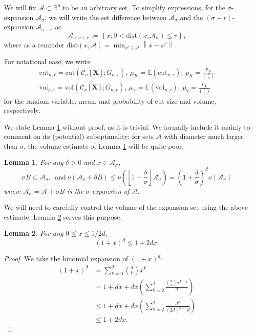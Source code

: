 \documentclass{article}
\newcommand{\set}[1]{\left\{#1\right\}}
\newcommand{\vol}{\mathrm{vol}}
\newcommand{\Reals}{\mathbb{R}}
\newcommand{\Rd}{\Reals^d}
\newcommand{\norm}[1]{\left\lVert#1\right\rVert}
\newcommand{\1}{\mathbf{1}}
\newcommand{\dist}{\mathrm{dist}}
\newcommand{\cut}{\mathrm{cut}}
\newcommand{\Xbf}{\mathbf{X}}
\newcommand{\Cset}{\mathcal{C}}
\newcommand{\Aset}{\mathcal{A}}
\newcommand{\Asig}{\Aset_{\sigma}}
\newcommand{\Csig}{\Cset_{\sigma}}
\newcommand{\Asigr}{\Aset_{\sigma,\sigma + r}}
\theoremstyle{aldenthm}
\newtheorem{lemma}{Lemma}
\begin{document}
We will fix $\Aset \subset \Rd$ to be an arbitrary set. To simplify expressions, for the $\sigma$-expansion $\Asig$, we will write the set difference between $\Asig$ and the $(\sigma + r)$-expansion $\Aset_{\sigma + r}$ as 
\begin{equation*}
\Asigr := \set{x: 0 < \dist(x, \Asig) \leq r},
\end{equation*}
where as a reminder $\dist(x, \Aset) = \min_{x' \in \Aset} \norm{x - x'}$.

For notational ease, we write
\begin{align*}
\cut_{n,r} = \cut(\Csig[\Xbf]; G_{n,r}), ~ \mu_K = \mathbb{E}(\cut_{n,r}), ~ p_K = \frac{\mu_K}{{n \choose 2}} \\
\vol_{n,r} = \vol(\Csig[\Xbf]; G_{n,r}), ~ \mu_V = \mathbb{E}(\vol_{n,r}), ~ p_V = \frac{\mu_V}{{n \choose 2}}
\end{align*}
for the random variable, mean, and probability of cut size and volume, respectively. 

We state Lemma \ref{lem: expansion_sets} without proof, as it is trivial. We formally include it mainly to comment on its (potential) suboptimality; for sets $\Aset$ with diameter much larger than $\sigma$, the volume estimate of Lemma \ref{lem: expansion_sets} will be quite poor. 

\begin{lemma}
	\label{lem: expansion_sets}
	For any $\delta > 0$ and $x \in \Aset_{\sigma}$,
	\begin{equation*}
	\sigma B \subset \Asig, ~~\mathrm{and~ }\nu(\Asig + \delta B) \leq \nu\left(\left[1 + \frac{\delta}{\sigma}\right]\Asig\right) = \left(1 + \frac{\delta}{\sigma}\right)^d \nu(\Asig)
	\end{equation*}
	where $\Asig = \Aset + \sigma B$ is the $\sigma$-expansion of $\Aset$.
\end{lemma}

We will need to carefully control the volume of the expansion set using the above estimate; Lemma \ref{lem: Taylor_series} serves this purpose.
\begin{lemma}
	\label{lem: Taylor_series}
	For any $0 \leq x \leq 1/2d$,
	\begin{equation*}
	(1 + x)^d \leq 1 + 2dx.
	\end{equation*}
\end{lemma}
\begin{proof}
	We take the binomial expansion of $(1 + x)^d$:
	\begin{align*}
	(1 + x)^d & = \sum_{k = 0}^{d} {d \choose k} x^k \\
	& = 1 + dx + dx\left(\sum_{k = 2}^d \frac{{d \choose k} x^{k - 1}}{d}\right)\\
	& \leq 1 + dx + dx\left(\sum_{k = 2}^d \frac{d^{k}}{(2d)^{k-1}d}\right) \\
	& \leq 1 + 2dx.
	\end{align*}
\end{proof}
\end{document}
